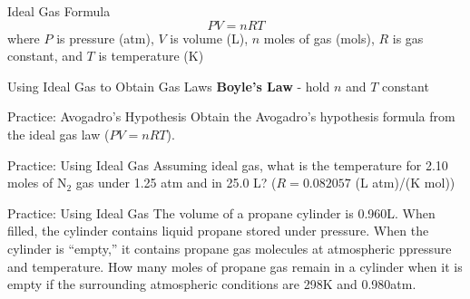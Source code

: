 \documentclass[11pt]{beamer}
\begin{document}
\begin{frame}{Ideal Gas Formula}
  \begin{equation}
    PV = nRT
  \end{equation}
  where $P$ is pressure (atm), $V$ is volume (L), $n$ moles of gas (mols),
  $R$ is gas constant, and $T$ is temperature (K)

\end{frame}

\begin{frame}{Using Ideal Gas to Obtain Gas Laws}
  \textbf{Boyle's Law} - hold $n$ and $T$ constant
\end{frame}

\begin{frame}{Practice: Avogadro's Hypothesis}
  Obtain the Avogadro's hypothesis formula from the ideal gas law
  ($PV = nRT$).
  \vspace{1in}
\end{frame}

\begin{frame}{Practice: Using Ideal Gas}
  Assuming ideal gas, what is the temperature for 2.10 moles of N$_2$ gas under
  1.25 atm and in 25.0 L? ($R=0.082057$ (L atm)/(K mol))
  \vspace{1in}
\end{frame}

\begin{frame}{Practice: Using Ideal Gas}
  The volume of a propane cylinder is 0.960L. When filled, the cylinder contains
  liquid propane stored under pressure. When the cylinder is ``empty,'' it contains
  propane gas molecules at atmospheric ppressure and temperature. How many
  moles of propane gas remain in a cylinder when it is empty if the surrounding
  atmospheric conditions are 298K and 0.980atm.
  \vspace{1.2in}
\end{frame}
\end{document}
